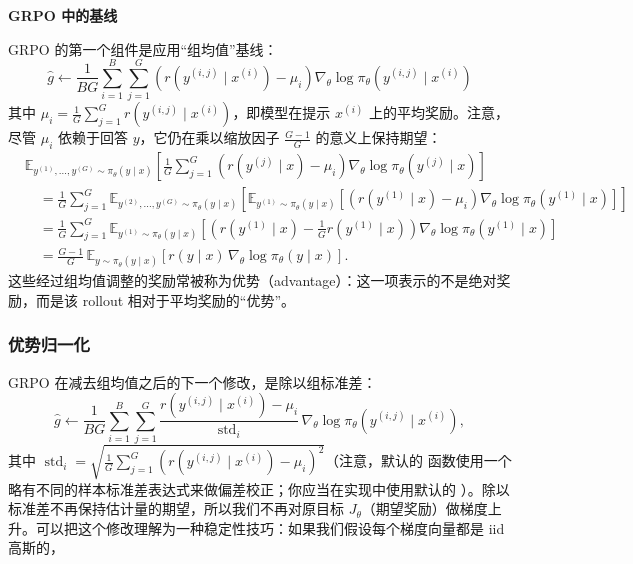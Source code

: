 \noindent\textbf{GRPO 中的基线}

GRPO 的第一个组件是应用“组均值”基线：
\begin{equation}
\hat{g} \leftarrow \frac{1}{BG}\sum_{i=1}^{B}\sum_{j=1}^{G} \left(r(y^{(i,j)} \mid x^{(i)}) - \mu_i\right)\nabla_\theta \log \pi_\theta(y^{(i,j)} \mid x^{(i)})
\end{equation}
其中 $\mu_i = \frac{1}{G}\sum_{j=1}^{G} r(y^{(i,j)} \mid x^{(i)})$，即模型在提示 $x^{(i)}$ 上的平均奖励。注意，尽管 $\mu_i$ 依赖于回答 $y$，它仍在乘以缩放因子 $\frac{G-1}{G}$ 的意义上保持期望：
\begin{align}
&\mathbb{E}_{y^{(1)},\dots,y^{(G)}\sim\pi_\theta(y \mid x)}\!\left[\frac{1}{G}\sum_{j=1}^{G} \left(r(y^{(j)} \mid x) - \mu_i\right)\nabla_\theta \log \pi_\theta(y^{(j)} \mid x)\right] \\
&\quad = \frac{1}{G}\sum_{j=1}^{G} \mathbb{E}_{y^{(2)},\dots,y^{(G)}\sim\pi_\theta(y \mid x)}\!\left[\mathbb{E}_{y^{(1)}\sim\pi_\theta(y \mid x)}\!\left[\left(r(y^{(1)} \mid x) - \mu_i\right)\nabla_\theta \log \pi_\theta(y^{(1)} \mid x)\right]\right] \\
&\quad = \frac{1}{G}\sum_{j=1}^{G} \mathbb{E}_{y^{(1)}\sim\pi_\theta(y \mid x)}\!\left[\left(r(y^{(1)} \mid x) - \frac{1}{G} r(y^{(1)} \mid x)\right)\nabla_\theta \log \pi_\theta(y^{(1)} \mid x)\right] \\
&\quad = \frac{G-1}{G}\, \mathbb{E}_{y\sim\pi_\theta(y \mid x)}[r(y \mid x)\, \nabla_\theta \log \pi_\theta(y \mid x)].
\end{align}
这些经过组均值调整的奖励常被称为优势（advantage）：这一项表示的不是绝对奖励，而是该 rollout 相对于平均奖励的“优势”。

\subsubsection{优势归一化}

GRPO 在减去组均值之后的下一个修改，是除以组标准差：
\begin{equation}
\hat{g} \leftarrow \frac{1}{BG}\sum_{i=1}^{B}\sum_{j=1}^{G} \frac{r(y^{(i,j)} \mid x^{(i)}) - \mu_i}{\operatorname{std}_i}\, \nabla_\theta \log \pi_\theta(y^{(i,j)} \mid x^{(i)}),
\end{equation}
其中 $\operatorname{std}_i = \sqrt{\frac{1}{G}\sum_{j=1}^{G}\left(r(y^{(i,j)} \mid x^{(i)}) - \mu_i\right)^2}$（注意，默认的  函数使用一个略有不同的样本标准差表达式来做偏差校正；你应当在实现中使用默认的 ）。除以标准差不再保持估计量的期望，所以我们不再对原目标 $J_\theta$（期望奖励）做梯度上升。可以把这个修改理解为一种稳定性技巧：如果我们假设每个梯度向量都是 iid 高斯的，

